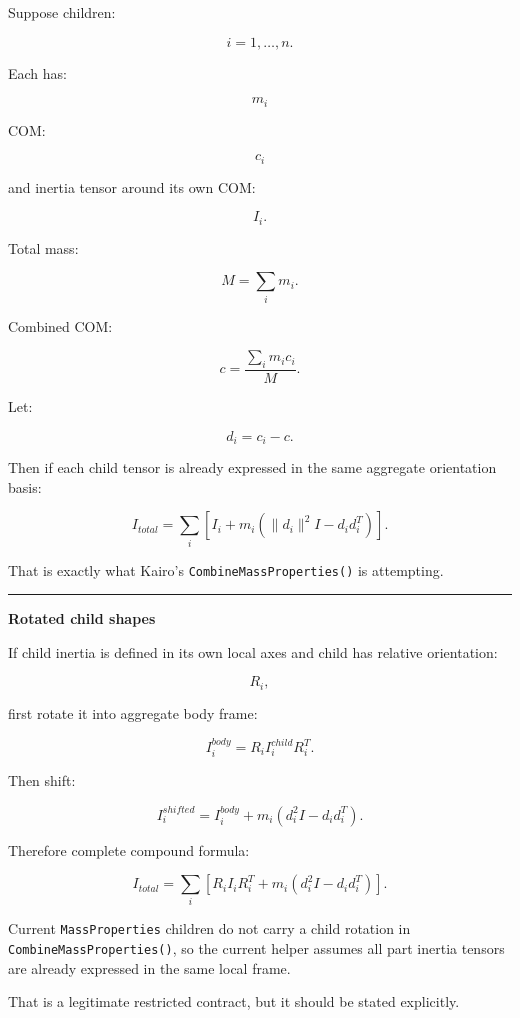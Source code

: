 \hypertarget{06-engine-ii-ch035-part-1637-composite-body-mass-properties}{}

Suppose children:

\[
i=1,\dots,n.
\]

Each has:

\[
m_i
\]

COM:

\[
c_i
\]

and inertia tensor around its own COM:

\[
I_i.
\]

Total mass:

\[
\boxed{
M=\sum_i m_i.
}
\]

Combined COM:

\[
\boxed{
c=
\frac{
\sum_i m_ic_i
}{
M
}.
}
\]

Let:

\[
d_i=c_i-c.
\]

Then if each child tensor is already expressed in the same aggregate orientation basis:

\[
\boxed{
I_{total}
=
\sum_i
\left[
I_i+
m_i
(
\|d_i\|^2I-d_id_i^T
)
\right].
}
\]

That is exactly what Kairo's \texttt{CombineMassProperties()} is attempting.

\begin{center}\rule{0.5\linewidth}{0.5pt}\end{center}

\textbf{Rotated child shapes}

If child inertia is defined in its own local axes and child has relative orientation:

\[
R_i,
\]

first rotate it into aggregate body frame:

\[
I_i^{body}
=
R_i
I_i^{child}
R_i^T.
\]

Then shift:

\[
I_i^{shifted}
=
I_i^{body}
+
m_i
(
d_i^2I-d_id_i^T
).
\]

Therefore complete compound formula:

\[
\boxed{
I_{total}
=
\sum_i
\left[
R_iI_iR_i^T
+
m_i
(
d_i^2I-d_id_i^T
)
\right].
}
\]

Current \texttt{MassProperties} children do not carry a child rotation in \texttt{CombineMassProperties()}, so the current helper assumes all part inertia tensors are already expressed in the same local frame.

That is a legitimate restricted contract, but it should be stated explicitly.


